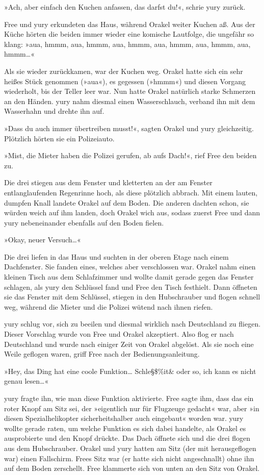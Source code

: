 »Ach, aber einfach den Kuchen anfassen, das darfst du!«, schrie yury zurück.

Free und yury erkundeten das Haus, während Orakel weiter Kuchen aß. Aus der Küche hörten die beiden immer wieder eine komische Lautfolge, die ungefähr so klang: »aua, hmmm, aua, hmmm, aua, hmmm, aua, hmmm, aua, hmmm, aua, hmmm…«

Als sie wieder zurückkamen, war der Kuchen weg. Orakel hatte sich ein sehr heißes Stück genommen (»aua«), es gegessen (»hmmm«) und diesen Vorgang wiederholt, bis der Teller leer war. Nun hatte Orakel natürlich starke Schmerzen an den Händen. yury nahm diesmal einen Wasserschlauch, verband ihn mit dem Wasserhahn und drehte ihn auf.

»Dass du auch immer übertreiben musst!«, sagten Orakel und yury gleichzeitig. Plötzlich hörten sie ein Polizeiauto.

»Mist, die Mieter haben die Polizei gerufen, ab aufs Dach!«, rief Free den beiden zu.

Die drei stiegen aus dem Fenster und kletterten an der am Fenster entlanglaufenden Regenrinne hoch, als diese plötzlich abbrach. Mit einem lauten, dumpfen Knall landete Orakel auf dem Boden. Die anderen dachten schon, sie würden weich auf ihm landen, doch Orakel wich aus, sodass zuerst Free und dann yury nebeneinander ebenfalls auf den Boden fielen.

»Okay, neuer Versuch…«

Die drei liefen in das Haus und suchten in der oberen Etage nach einem Dachfenster. Sie fanden eines, welches aber verschlossen war. Orakel nahm einen kleinen Tisch aus dem Schlafzimmer und wollte damit gerade gegen das Fenster schlagen, als yury den Schlüssel fand und Free den Tisch festhielt. Dann öffneten sie das Fenster mit dem Schlüssel, stiegen in den Hubschrauber und flogen schnell weg, während die Mieter und die Polizei wütend nach ihnen riefen.

yury schlug vor, sich zu beeilen und diesmal wirklich nach Deutschland zu fliegen. Dieser Vorschlag wurde von Free und Orakel akzeptiert. Also flog er nach Deutschland und wurde nach einiger Zeit von Orakel abgelöst. Als sie noch eine Weile geflogen waren, griff Free nach der Bedienungsanleitung.

»Hey, das Ding hat eine coole Funktion… Schle§\$\%\/it\& oder so, ich kann es nicht genau lesen…«

yury fragte ihn, wie man diese Funktion aktivierte. Free sagte ihm, dass das ein roter Knopf am Sitz sei, der »eigentlich nur für Flugzeuge gedacht« war, aber »in diesen Spezialhelikopter sicherheitshalber auch eingebaut« worden war. yury wollte gerade raten, um welche Funktion es sich dabei handelte, als Orakel es ausprobierte und den Knopf drückte. Das Dach öffnete sich und die drei flogen aus dem Hubschrauber. Orakel und yury hatten am Sitz (der mit herausgeflogen war) einen Fallschirm. Frees Sitz war (er hatte sich nicht angeschnallt) ohne ihn auf dem Boden zerschellt. Free klammerte sich von unten an den Sitz von Orakel.

